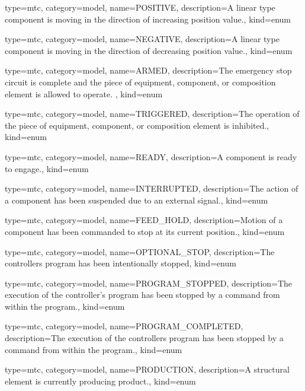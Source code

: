 {
  type=mtc,
  category=model,
  name={POSITIVE},
  description={A \gls{linear} type component is moving in the direction of increasing position value.},
  kind={enum}
}


{
  type=mtc,
  category=model,
  name={NEGATIVE},
  description={A \gls{linear} type component is moving in the direction of decreasing position value.},
  kind={enum}
}


{
  type=mtc,
  category=model,
  name={ARMED},
  description={The emergency stop circuit is complete and the piece of equipment, component, or composition element is allowed to operate. },
  kind={enum}
}


{
  type=mtc,
  category=model,
  name={TRIGGERED},
  description={The operation of the piece of equipment, component, or composition element is inhibited.},
  kind={enum}
}


{
  type=mtc,
  category=model,
  name={READY},
  description={A component is ready to engage.},
  kind={enum}
}


{
  type=mtc,
  category=model,
  name={INTERRUPTED},
  description={The action of a \gls{component} has been suspended due to an external signal.},
  kind={enum}
}


{
  type=mtc,
  category=model,
  name={FEED\_HOLD},
  description={Motion of a \gls{component} has been commanded to stop at its current position.},
  kind={enum}
}


{
  type=mtc,
  category=model,
  name={OPTIONAL\_STOP},
  description={The controllers program has been intentionally stopped},
  kind={enum}
}


{
  type=mtc,
  category=model,
  name={PROGRAM\_STOPPED},
  description={The execution of the \gls{controller}'s program has been stopped by a command from within the program.},
  kind={enum}
}


{
  type=mtc,
  category=model,
  name={PROGRAM\_COMPLETED},
  description={The execution of the controllers program has been stopped by a command from within the program.},
  kind={enum}
}


{
  type=mtc,
  category=model,
  name={PRODUCTION},
  description={A \gls{structural element} is currently producing product.},
  kind={enum}
}


